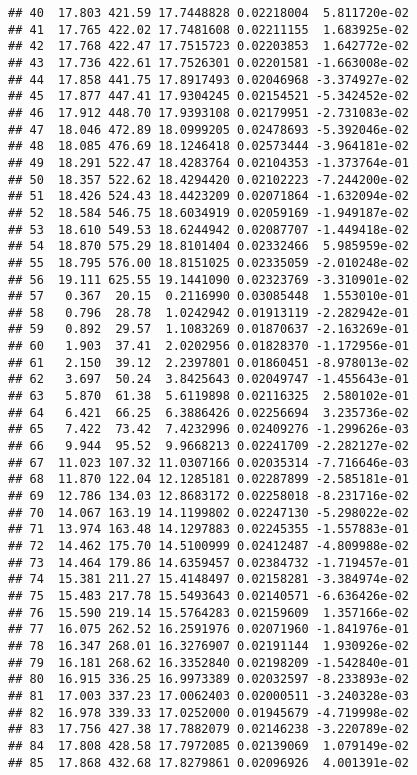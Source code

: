 \documentclass[]{book}
\theoremstyle{definition}
\theoremstyle{definition}
\theoremstyle{definition}
\theoremstyle{remark}
\begin{document}
\begin{verbatim}
## 40  17.803 421.59 17.7448828 0.02218004  5.811720e-02
## 41  17.765 422.02 17.7481608 0.02211155  1.683925e-02
## 42  17.768 422.47 17.7515723 0.02203853  1.642772e-02
## 43  17.736 422.61 17.7526301 0.02201581 -1.663008e-02
## 44  17.858 441.75 17.8917493 0.02046968 -3.374927e-02
## 45  17.877 447.41 17.9304245 0.02154521 -5.342452e-02
## 46  17.912 448.70 17.9393108 0.02179951 -2.731083e-02
## 47  18.046 472.89 18.0999205 0.02478693 -5.392046e-02
## 48  18.085 476.69 18.1246418 0.02573444 -3.964181e-02
## 49  18.291 522.47 18.4283764 0.02104353 -1.373764e-01
## 50  18.357 522.62 18.4294420 0.02102223 -7.244200e-02
## 51  18.426 524.43 18.4423209 0.02071864 -1.632094e-02
## 52  18.584 546.75 18.6034919 0.02059169 -1.949187e-02
## 53  18.610 549.53 18.6244942 0.02087707 -1.449418e-02
## 54  18.870 575.29 18.8101404 0.02332466  5.985959e-02
## 55  18.795 576.00 18.8151025 0.02335059 -2.010248e-02
## 56  19.111 625.55 19.1441090 0.02323769 -3.310901e-02
## 57   0.367  20.15  0.2116990 0.03085448  1.553010e-01
## 58   0.796  28.78  1.0242942 0.01913119 -2.282942e-01
## 59   0.892  29.57  1.1083269 0.01870637 -2.163269e-01
## 60   1.903  37.41  2.0202956 0.01828370 -1.172956e-01
## 61   2.150  39.12  2.2397801 0.01860451 -8.978013e-02
## 62   3.697  50.24  3.8425643 0.02049747 -1.455643e-01
## 63   5.870  61.38  5.6119898 0.02116325  2.580102e-01
## 64   6.421  66.25  6.3886426 0.02256694  3.235736e-02
## 65   7.422  73.42  7.4232996 0.02409276 -1.299626e-03
## 66   9.944  95.52  9.9668213 0.02241709 -2.282127e-02
## 67  11.023 107.32 11.0307166 0.02035314 -7.716646e-03
## 68  11.870 122.04 12.1285181 0.02287899 -2.585181e-01
## 69  12.786 134.03 12.8683172 0.02258018 -8.231716e-02
## 70  14.067 163.19 14.1199802 0.02247130 -5.298022e-02
## 71  13.974 163.48 14.1297883 0.02245355 -1.557883e-01
## 72  14.462 175.70 14.5100999 0.02412487 -4.809988e-02
## 73  14.464 179.86 14.6359457 0.02384732 -1.719457e-01
## 74  15.381 211.27 15.4148497 0.02158281 -3.384974e-02
## 75  15.483 217.78 15.5493643 0.02140571 -6.636426e-02
## 76  15.590 219.14 15.5764283 0.02159609  1.357166e-02
## 77  16.075 262.52 16.2591976 0.02071960 -1.841976e-01
## 78  16.347 268.01 16.3276907 0.02191144  1.930926e-02
## 79  16.181 268.62 16.3352840 0.02198209 -1.542840e-01
## 80  16.915 336.25 16.9973389 0.02032597 -8.233893e-02
## 81  17.003 337.23 17.0062403 0.02000511 -3.240328e-03
## 82  16.978 339.33 17.0252000 0.01945679 -4.719998e-02
## 83  17.756 427.38 17.7882079 0.02146238 -3.220789e-02
## 84  17.808 428.58 17.7972085 0.02139069  1.079149e-02
## 85  17.868 432.68 17.8279861 0.02096926  4.001391e-02

\end{verbatim}
\end{document}
